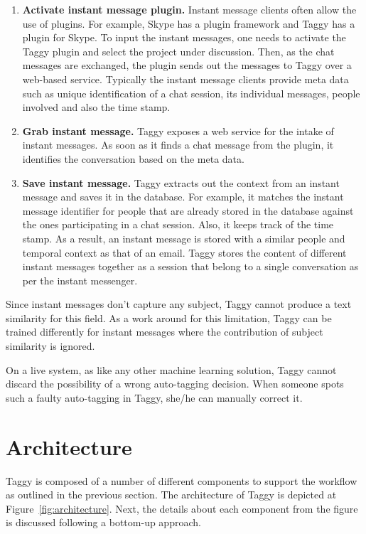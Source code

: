 \begin{enumerate}
	\item \textbf{Activate instant message plugin.} Instant message clients often allow the use of plugins. For example, Skype \cite{skype} has a plugin framework and Taggy has a plugin for Skype. To input the instant messages, one needs to activate the Taggy plugin and select the project under discussion. Then, as the chat messages are exchanged, the plugin sends out the messages to Taggy over a web-based service. Typically the instant message clients provide meta data such as unique identification of a chat session, its individual messages, people involved and also the time stamp.

	\item \textbf{Grab instant message.} Taggy exposes a web service for the intake of instant messages. As soon as it finds a chat message from the plugin, it identifies the conversation based on the meta data.
	
	\item \textbf{Save instant message.} Taggy extracts out the context from an instant message and saves it in the database. For example, it matches the instant message identifier for people that are already stored in the database against the ones participating in a chat session. Also, it keeps track of the time stamp. As a result, an instant message is stored with a similar people and temporal context as that of an email. Taggy stores the content of different instant messages together as a session that belong to a single conversation as per the instant messenger.
\end{enumerate}

Since instant messages don't capture any subject, Taggy cannot produce a text similarity for this field. As a work around for this limitation, Taggy can be trained differently for instant messages where the contribution of subject similarity is ignored.

On a live system, as like any other machine learning solution, Taggy cannot discard the possibility of a wrong auto-tagging decision. When someone spots such a faulty auto-tagging in Taggy, she/he can manually correct it.

\section{Architecture}
Taggy is composed of a number of different components to support the workflow as outlined in the previous section. The architecture of Taggy is depicted at Figure~\ref{fig:architecture}. Next, the details about each component from the figure is discussed following a bottom-up approach.

